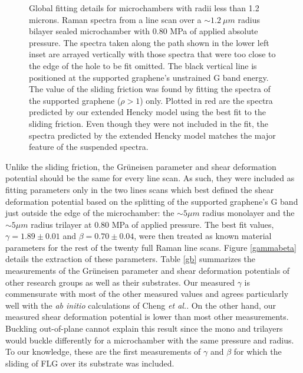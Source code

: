 \begin{figure}
\begin{center}
\end{center}
\caption{\label{igouter} Global fitting details for microchambers with radii less than 1.2 microns. Raman spectra from a line scan over a $\sim 1.2 \ \mu m$ radius bilayer sealed microchamber with 0.80 MPa of applied absolute pressure. The spectra taken along the path shown in the lower left inset are arrayed vertically with those spectra that were too close to the edge of the hole to be fit omitted.  The black vertical line is positioned at the supported graphene's unstrained G band energy.  The value of the sliding friction was found by fitting the spectra of the supported graphene ($\rho>1$) only.  Plotted in red are the spectra predicted by our extended Hencky model using the best fit to the sliding friction.  Even though they were not included in the fit, the spectra predicted by the extended Hencky model matches the major feature of the suspended spectra. }
\end{figure}

Unlike the sliding friction, the Gr\"{u}neisen parameter and shear deformation potential should be the same for every line scan.  As such, they were included as fitting parameters only in the two lines scans which best defined the shear deformation potential based on the splitting of the supported graphene's G band just outside the edge of the microchamber: the $\sim 5 \mu m$ radius monolayer and the $\sim 5 \mu m$ radius trilayer at 0.80 MPa of applied pressure.  The best fit values, $\gamma=1.89 \pm 0.01$ and $\beta=0.70 \pm 0.04$, were then treated as known material parameters for the rest of the twenty full Raman line scans.  Figure \ref{gammabeta} details the extraction of these parameters.  Table \ref{gb} summarizes the measurements of the Gr\"{u}neisen parameter and shear deformation potentials of other research groups as well as their substrates.  Our measured $\gamma$ is commensurate with most of the other measured values and agrees particularly well with the \textit{ab initio} calculations of Cheng \emph{et al.}\cite{Cheng2011}.  On the other hand, our measured shear deformation potential is lower than most other measurements.  Buckling out-of-plane cannot explain this result since the mono and trilayers would buckle differently for a microchamber with the same pressure and radius. To our knowledge, these are the first measurements of $\gamma$ and $\beta$ for which the sliding of FLG over its substrate was included.

